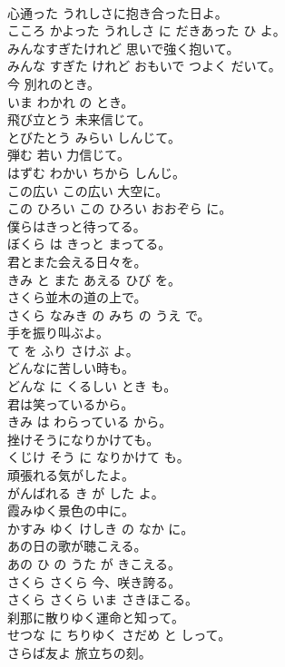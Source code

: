 \documentclass[8pt]{extreport}
\begin{document}
\begin{CJK}{UTF8}{min}
\\	心通った うれしさに抱き合った日よ。	
\\	こころ かよった うれしさ に だきあった ひ よ。	
\\	みんなすぎたけれど 思いで強く抱いて。	
\\	みんな すぎた けれど おもいで つよく だいて。	
\\	今 別れのとき。	
\\	いま わかれ の とき。	
\\	飛び立とう 未来信じて。	
\\	とびたとう みらい しんじて。	
\\	弾む 若い 力信じて。	
\\	はずむ わかい ちから しんじ。	
\\	この広い この広い 大空に。	
\\	この ひろい この ひろい おおぞら に。	
\\	僕らはきっと待ってる。	
\\	ぼくら は きっと まってる。	
\\	君とまた会える日々を。	
\\	きみ と また あえる ひび を。	
\\	さくら並木の道の上で。	
\\	さくら なみき の みち の うえ で。	
\\	手を振り叫ぶよ。	
\\	て を ふり さけぶ よ。	
\\	どんなに苦しい時も。	
\\	どんな に くるしい とき も。	
\\	君は笑っているから。	
\\	きみ は わらっている から。	
\\	挫けそうになりかけても。	
\\	くじけ そう に なりかけて も。	
\\	頑張れる気がしたよ。	
\\	がんばれる き が した よ。	
\\	霞みゆく景色の中に。	
\\	かすみ ゆく けしき の なか に。	
\\	あの日の歌が聴こえる。	
\\	あの ひ の うた が きこえる。	
\\	さくら さくら 今、咲き誇る。	
\\	さくら さくら いま さきほこる。	
\\	刹那に散りゆく運命と知って。	
\\	せつな に ちりゆく さだめ と しって。	
\\	さらば友よ 旅立ちの刻。	

\end{CJK}
\end{document}
